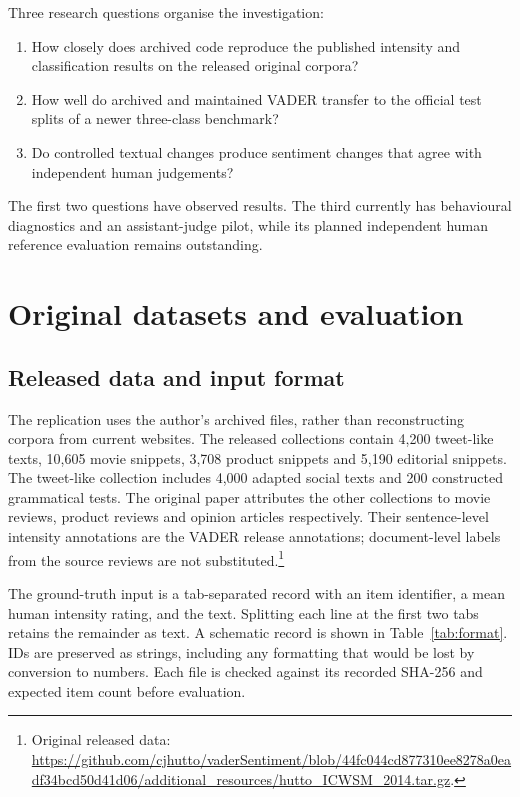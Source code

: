\documentclass[11pt]{article}
\begin{document}
Three research questions organise the investigation:
\begin{enumerate}
\item How closely does archived code reproduce the published intensity and
classification results on the released original corpora?
\item How well do archived and maintained VADER transfer to the official test
splits of a newer three-class benchmark?
\item Do controlled textual changes produce sentiment changes that agree with
independent human judgements?
\end{enumerate}
The first two questions have observed results. The third currently has behavioural
diagnostics and an assistant-judge pilot, while its planned independent human
reference evaluation remains outstanding.

\section{Original datasets and evaluation}

\subsection{Released data and input format}
The replication uses the author's archived files, rather than reconstructing
corpora from current websites. The released collections contain 4,200 tweet-like
texts, 10,605 movie snippets, 3,708 product snippets and 5,190 editorial snippets.
The tweet-like collection includes 4,000 adapted social texts and 200 constructed
grammatical tests. The original paper attributes the other collections to movie
reviews, product reviews and opinion articles respectively. Their sentence-level
intensity annotations are the VADER release annotations; document-level labels
from the source reviews are not substituted.\footnote{Original released data:
\url{https://github.com/cjhutto/vaderSentiment/blob/44fc044cd877310ee8278a0eadf34bcd50d41d06/additional_resources/hutto_ICWSM_2014.tar.gz}.}

The ground-truth input is a tab-separated record with an item identifier, a mean
human intensity rating, and the text. Splitting each line at the first two tabs
retains the remainder as text. A schematic record is shown in
Table~\ref{tab:format}. IDs are preserved as strings, including any formatting
that would be lost by conversion to numbers. Each file is checked against its
recorded SHA-256 and expected item count before evaluation.
\end{document}

